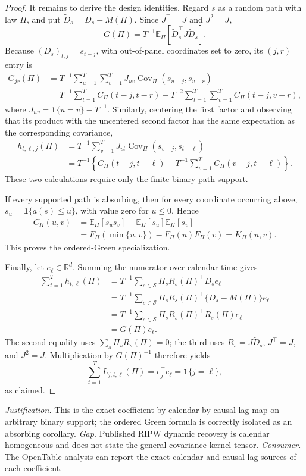 \documentclass{article}
\begin{document}
\begin{proof}
It remains to derive the design identities.  Regard \(s\) as a random path with law \(\Pi\), and put \(\widetilde D_s=D_s-M(\Pi)\).  Since \(J^{\top}=J\) and \(J^2=J\),
\[
 G(\Pi)=T^{-1}\mathbb E_{\Pi}[\widetilde D_s^{\top}J\widetilde D_s].
\]
Because \((D_s)_{t,j}=s_{t-j}\), with out-of-panel coordinates set to zero, its \((j,r)\) entry is
\[
\begin{aligned}
 G_{jr}(\Pi)
 &=T^{-1}\sum_{u=1}^{T}\sum_{v=1}^{T}J_{uv}
   \operatorname{Cov}_{\Pi}(s_{u-j},s_{v-r})\\
 &=T^{-1}\sum_{t=1}^{T}C_{\Pi}(t-j,t-r)
   -T^{-2}\sum_{t=1}^{T}\sum_{v=1}^{T}C_{\Pi}(t-j,v-r),
\end{aligned}
\]
where \(J_{uv}=\mathbf 1\{u=v\}-T^{-1}\).  Similarly, centering the first factor and observing that its product with the uncentered second factor has the same expectation as the corresponding covariance,
\[
\begin{aligned}
 h_{t,\ell,j}(\Pi)
 &=T^{-1}\sum_{v=1}^{T}J_{vt}
   \operatorname{Cov}_{\Pi}(s_{v-j},s_{t-\ell})\\
 &=T^{-1}\left\{C_{\Pi}(t-j,t-\ell)
   -T^{-1}\sum_{v=1}^{T}C_{\Pi}(v-j,t-\ell)\right\}.
\end{aligned}
\]
These two calculations require only the finite binary-path support.

If every supported path is absorbing, then for every coordinate occurring above,
\(s_u=\mathbf 1\{a(s)\leq u\}\), with value zero for \(u\leq0\).  Hence
\[
\begin{aligned}
 C_{\Pi}(u,v)
 &=\mathbb E_{\Pi}[s_us_v]-\mathbb E_{\Pi}[s_u]\mathbb E_{\Pi}[s_v]\\
 &=F_{\Pi}(\min\{u,v\})-F_{\Pi}(u)F_{\Pi}(v)
 =K_{\Pi}(u,v).
\end{aligned}
\]
This proves the ordered-Green specialization.

Finally, let \(e_{\ell}\in\mathbb R^d\).  Summing the numerator over calendar time gives
\[
\begin{aligned}
 \sum_{t=1}^{T}h_{t,\ell}(\Pi)
 &=T^{-1}\sum_{s\in\mathcal S}\Pi_sR_s(\Pi)^{\top}D_se_{\ell}\\
 &=T^{-1}\sum_{s\in\mathcal S}\Pi_sR_s(\Pi)^{\top}
   \{D_s-M(\Pi)\}e_{\ell}\\
 &=T^{-1}\sum_{s\in\mathcal S}\Pi_sR_s(\Pi)^{\top}R_s(\Pi)e_{\ell}\\
 &=G(\Pi)e_{\ell}.
\end{aligned}
\]
The second equality uses \(\sum_s\Pi_sR_s(\Pi)=0\); the third uses \(R_s=J\widetilde D_s\), \(J^{\top}=J\), and \(J^2=J\).  Multiplication by \(G(\Pi)^{-1}\) therefore yields
\[
 \sum_{t=1}^{T}L_{j,t,\ell}(\Pi)
 =e_j^{\top}e_{\ell}=\mathbf 1\{j=\ell\},
\]
as claimed.
\end{proof}
\par\smallskip\noindent \textit{Justification.} This is the exact coefficient-by-calendar-by-causal-lag map on arbitrary binary support; the ordered Green formula is correctly isolated as an absorbing corollary. \textit{Gap.} Published RIPW dynamic recovery is calendar homogeneous and does not state the general covariance-kernel tensor. \textit{Consumer.} The OpenTable analysis can report the exact calendar and causal-lag sources of each coefficient.
\end{document}
